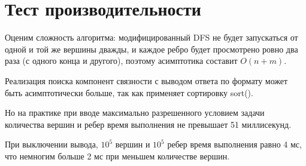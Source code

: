  
\section{Тест производительности}

Оценим сложность алгоритма: модифицированный DFS не будет запускаться от одной и той же вершины дважды, и каждое ребро будет просмотрено ровно два раза (с одного конца и другого), поэтому асимптотика составит $O(n+m)$.

Реализация поиска компонент связности с выводом ответа по формату может быть асимптотически больше, так как применяет сортировку sort().

Но на практике при вводе максимально разрешенного условием задачи количества вершин и ребер время выполнения не превышает 51 миллисекунд.

При выключении вывода, $10^5$ вершин и $10^5$ ребер время выполнения равно 4 мс, что немногим больше 2 мс при меньшем количестве вершин.
\pagebreak